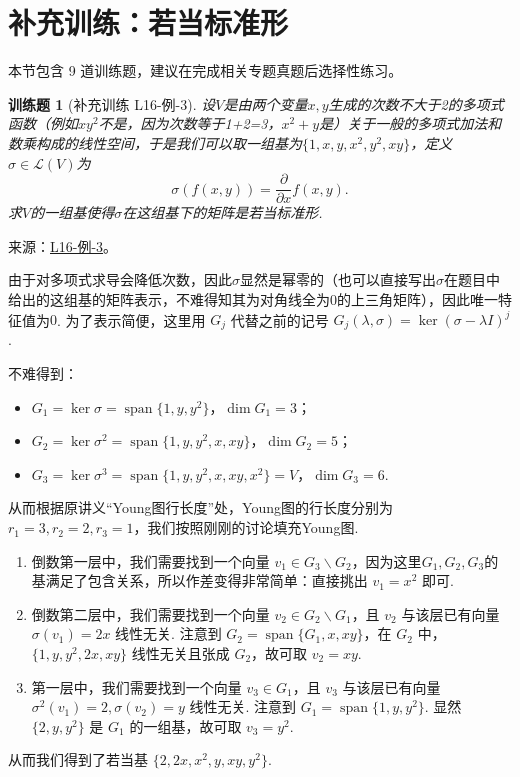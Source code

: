 \documentclass[12pt,fontset=fandol]{ctexart}
\newtheorem{exercise}{训练题}[section]
\begin{document}
\section{补充训练：若当标准形}

本节包含 9 道训练题，建议在完成相关专题真题后选择性练习。

\begin{exercise}[补充训练 L16-例-3]\label{prob:L16-例-3}
设$V$是由两个变量$x,y$生成的次数不大于2的多项式函数（例如$xy^2$不是，因为次数等于1+2=3，$x^2+y$是）关于一般的多项式加法和数乘构成的线性空间，于是我们可以取一组基为$\{1,x,y,x^2,y^2,xy\}$，定义$\sigma\in \mathcal{L}(V)$为
    \[\sigma(f(x,y))=\dfrac{\partial}{\partial x}f(x,y).\]
    求$V$的一组基使得$\sigma$在这组基下的矩阵是若当标准形.
\end{exercise}
\noindent 来源：\href{https://github.com/yhwu-is/Linear-Algebra-Left-Undone/blob/new/%E8%AE%B2%E4%B9%89/%E4%B8%93%E9%A2%98/16%20%E8%8B%A5%E5%BD%93%E6%A0%87%E5%87%86%E5%BD%A2.tex}{L16-例-3}。
\begin{solve}
由于对多项式求导会降低次数，因此$\sigma$显然是幂零的（也可以直接写出$\sigma$在题目中给出的这组基的矩阵表示，不难得知其为对角线全为$0$的上三角矩阵），因此唯一特征值为$0$. 为了表示简便，这里用 $G_j$ 代替之前的记号 $G_j(\lambda,\sigma)=\ker (\sigma-\lambda I)^j$.

    不难得到：
    \begin{itemize}
        \item $G_1 = \ker \sigma = \operatorname{span}\{1, y, y^2\}$，$\dim G_1 = 3$；
        \item $G_2 = \ker \sigma^2 = \operatorname{span}\{1, y, y^2, x, xy\}$，$\dim G_2 = 5$；
        \item $G_3 = \ker \sigma^3 = \operatorname{span}\{1, y, y^2, x, xy, x^2\} = V$，$\dim G_3 = 6$.
    \end{itemize}

    从而根据原讲义“Young图行长度”处，Young图的行长度分别为 $r_1 = 3, r_2 = 2, r_3 = 1$，我们按照刚刚的讨论填充Young图.

    \begin{enumerate}
        \item 倒数第一层中，我们需要找到一个向量 $v_1 \in G_3 \backslash G_2$，因为这里$G_1, G_2, G_3$的基满足了包含关系，所以作差变得非常简单：直接挑出 $v_1=x^2$ 即可.
        \item 倒数第二层中，我们需要找到一个向量 $v_2 \in G_2 \backslash G_1$，且 $v_2$ 与该层已有向量 $\sigma(v_1)=2x$ 线性无关. 注意到 $G_2 = \operatorname{span}\{G_1, x, xy\}$，在 $G_2$ 中，$\{1, y, y^2, 2x, xy\}$ 线性无关且张成 $G_2$，故可取 $v_2 = xy$.
        \item 第一层中，我们需要找到一个向量 $v_3 \in G_1$，且 $v_3$ 与该层已有向量 $\sigma^2(v_1)=2, \sigma(v_2)=y$ 线性无关. 注意到 $G_1 = \operatorname{span}\{1, y, y^2\}$. 显然 $\{2, y, y^2\}$ 是 $G_1$ 的一组基，故可取 $v_3 = y^2$.
    \end{enumerate}

    从而我们得到了若当基 $\{2, 2x, x^2, y, xy, y^2\}$.
\end{solve}
\end{document}
